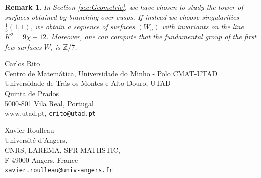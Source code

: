\documentclass[10pt,a4paper]{article}
\newcommand{\ZZ}{\mathbb{Z}}
\newtheorem{remark}[theorem]{Remark}
\begin{document}
\begin{remark}
In Section \textup{\ref{sec:Geometrie}}, we have chosen to study the tower of surfaces
obtained by branching over cusps. If instead we choose singularities
$\frac{1}{3}(1,1)$, we obtain a sequence of surfaces $(W_{n})$
with invariants on the line $K^2=9\chi-12$.
Moreover, one can compute that the fundamental group of the first few
surfaces $W_{i}$ is $\ZZ/7$. 
\end{remark}




%

 

\vspace{1cm}

\noindent Carlos Rito
\vspace{0.1cm}
\\ Centro de Matem\'atica, Universidade do Minho - Polo CMAT-UTAD
\vspace{0.1cm}
\\ Universidade de Tr\'as-os-Montes e Alto Douro, UTAD
\\ Quinta de Prados
\\ 5000-801 Vila Real, Portugal
\vspace{0.1cm}
\\ www.utad.pt, {\tt crito@utad.pt}

\vspace{1cm}

\noindent Xavier Roulleau \vspace{0.1cm} 
\\Université d’Angers,
\\CNRS, LAREMA, SFR MATHSTIC,
\\F-49000 Angers, France
\\ \verb|xavier.roulleau@univ-angers.fr| 
\end{document}
